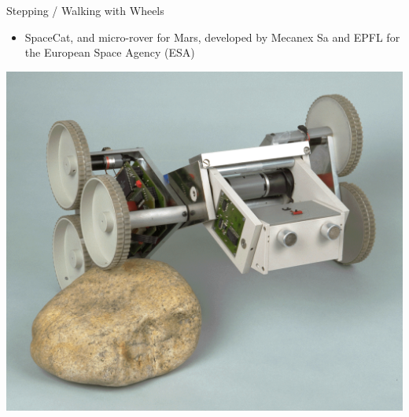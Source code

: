 \documentclass[compress]{beamer}
\begin{document}
\begin{frame}{Stepping / Walking with Wheels}

\begin{itemize}
    \item SpaceCat, and micro-rover for Mars, developed by Mecanex Sa and EPFL
  for the European Space Agency (ESA)
\end{itemize}

    \begin{center}
        \includegraphics[width=0.4\linewidth]{walkingwheels_ex1}
    \end{center}
\end{frame}

\end{document}

